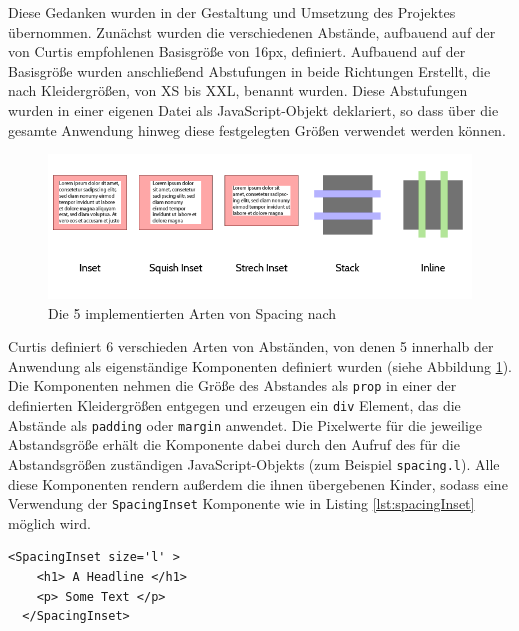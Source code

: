 Diese Gedanken wurden in der Gestaltung und Umsetzung des Projektes übernommen. Zunächst wurden die verschiedenen Abstände, aufbauend auf der von Curtis empfohlenen Basisgröße von 16px, definiert. Aufbauend auf der Basisgröße wurden anschließend Abstufungen in beide Richtungen
Erstellt, die nach Kleidergrößen, von XS bis XXL, benannt wurden.
Diese Abstufungen wurden in einer eigenen Datei als JavaScript-Objekt deklariert, so dass über die gesamte Anwendung hinweg diese festgelegten Größen verwendet werden können.

\begin{figure}[h]
    \centering
    \includegraphics[width=1\textwidth]{images/spacing_types.png}
    \caption{Die 5 implementierten Arten von Spacing nach \cite{CurtisSpace16}}
    \label{fig:spacing}
\end{figure}


Curtis definiert 6 verschieden Arten von Abständen, von denen 5 innerhalb der Anwendung als eigenständige Komponenten definiert wurden (siehe Abbildung \ref{fig:spacing}).\\
Die Komponenten nehmen die Größe des Abstandes als \verb|prop| in einer der definierten Kleidergrößen entgegen und erzeugen ein \verb|div| Element, das die Abstände als \verb|padding| oder \verb|margin| anwendet.
Die Pixelwerte für die jeweilige Abstandsgröße erhält die Komponente dabei durch den Aufruf des für die Abstandsgrößen zuständigen JavaScript-Objekts (zum Beispiel \verb|spacing.l|). Alle diese Komponenten rendern außerdem die ihnen übergebenen Kinder, sodass eine Verwendung der \verb|SpacingInset| Komponente wie in Listing \ref{lst:spacingInset} möglich wird.

\begin{lstlisting}[caption=Beispielhafte Verwendung einer Komponente für Abstände, label=lst:spacingInset]
  <SpacingInset size='l' >
    <h1> A Headline </h1>
    <p> Some Text </p>
  </SpacingInset>
\end{lstlisting}

